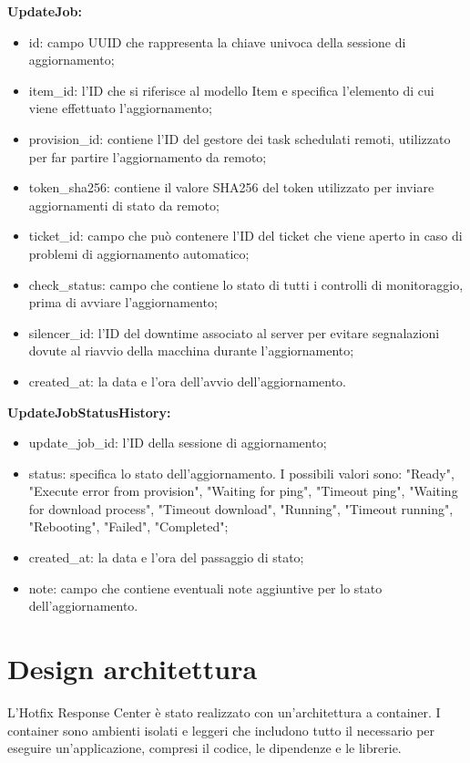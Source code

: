 \textbf{UpdateJob:}
\begin{itemize}
\item id: campo UUID che rappresenta la chiave univoca della sessione di aggiornamento;
\item item\_id: l'ID che si riferisce al modello Item e specifica l'elemento di cui viene effettuato l'aggiornamento;
\item provision\_id: contiene l'ID del gestore dei task schedulati remoti, utilizzato per far partire l'aggiornamento da remoto;
\item token\_sha256: contiene il valore SHA256 del token utilizzato per inviare aggiornamenti di stato da remoto;
\item ticket\_id: campo che può contenere l'ID del ticket che viene aperto in caso di problemi di aggiornamento automatico;
\item check\_status: campo che contiene lo stato di tutti i controlli di monitoraggio, prima di avviare l'aggiornamento;
\item silencer\_id: l'ID del downtime associato al server per evitare segnalazioni dovute al riavvio della macchina durante l'aggiornamento;
\item created\_at: la data e l'ora dell'avvio dell'aggiornamento.
\end{itemize}

\textbf{UpdateJobStatusHistory:}
\begin{itemize}
\item update\_job\_id:  l'ID della sessione di aggiornamento;
\item status: specifica lo stato dell'aggiornamento. I possibili valori sono: "Ready", "Execute error from provision", "Waiting for ping", "Timeout ping", "Waiting for download process", "Timeout download", "Running", "Timeout running", "Rebooting", "Failed", "Completed";
\item created\_at: la data e l'ora del passaggio di stato;
\item note: campo che contiene eventuali note aggiuntive per lo stato dell'aggiornamento.
\end{itemize}


\section{Design architettura}
L’Hotfix Response Center è stato realizzato con un’architettura a container. 
I container sono ambienti isolati e leggeri che includono tutto il necessario 
per eseguire un'applicazione, compresi il codice, le dipendenze e le librerie.

